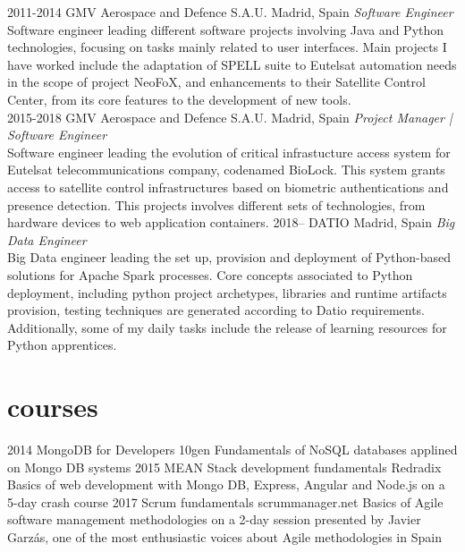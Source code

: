 \documentclass[]{friggeri-cv}
\begin{document}
\begin{entrylist}
\entry
{2011-2014}
{GMV Aerospace and Defence S.A.U.}
{Madrid, Spain}
{\emph{Software Engineer} \\
Software engineer leading different software projects involving Java and Python technologies, focusing on tasks mainly related to user interfaces.
Main projects I have worked include the adaptation of SPELL suite to Eutelsat automation needs in the scope of project NeoFoX, and enhancements to
their Satellite Control Center, from its core features to the development of new tools.} \\
\entry
{2015-2018}
{GMV Aerospace and Defence S.A.U.}
{Madrid, Spain}
{\emph{Project Manager | Software Engineer} \\
Software engineer leading the evolution of critical infrastucture access system for Eutelsat telecommunications company, codenamed BioLock. This system
grants access to satellite control infrastructures based on biometric authentications and presence detection.
This projects involves different sets of technologies, from hardware devices to web application containers.}
\entry
{2018--}
{DATIO}
{Madrid, Spain}
{\emph{Big Data Engineer} \\
Big Data engineer leading the set up, provision and deployment of Python-based solutions for Apache Spark processes.
Core concepts associated to Python deployment, including python project archetypes, libraries and runtime artifacts provision, testing techniques are
generated according to Datio requirements. Additionally, some of my daily tasks include the release of learning resources for Python apprentices.}
\end{entrylist}


\section{courses}

\begin{entrylist}
\entry
{2014}
{MongoDB for Developers}
{10gen}
{Fundamentals of NoSQL databases applined on Mongo DB systems}
\entry
{2015}
{MEAN Stack development fundamentals}
{Redradix}
{Basics of web development with Mongo DB, Express, Angular and Node.js on a 5-day crash course}
\entry
{2017}
{Scrum fundamentals}
{scrummanager.net}
{Basics of Agile software management methodologies on a 2-day session presented by Javier Garzás, one of the most enthusiastic voices about Agile methodologies in Spain}
\end{entrylist}
\end{document}
